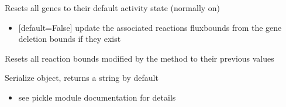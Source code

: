 \documentclass[letterpaper,10pt,english]{sphinxmanual}
\begin{document}
\begin{fulllineitems}
\begin{fulllineitems}
\end{fulllineitems}


\begin{fulllineitems}
\label{\detokenize{modules_doc:cbmpy.CBModel.Model.resetAllGenes}}
\pysigstartsignatures
{}
\pysigstopsignatures
\sphinxAtStartPar
Resets all genes to their default activity state (normally on)
\begin{itemize}
\item {} 
\sphinxAtStartPar
{} {[}default=False{]} update the associated reactions fluxbounds from the gene deletion bounds if they exist

\end{itemize}

\end{fulllineitems}


\begin{fulllineitems}
\label{\detokenize{modules_doc:cbmpy.CBModel.Model.resetAllInactiveGPRBounds}}
\pysigstartsignatures
{}
\pysigstopsignatures
\sphinxAtStartPar
Resets all reaction bounds modified by the  method to their previous values

\end{fulllineitems}


\begin{fulllineitems}
\label{\detokenize{modules_doc:cbmpy.CBModel.Model.serialize}}
\pysigstartsignatures
{}
\pysigstopsignatures
\sphinxAtStartPar
Serialize object, returns a string by default
\begin{itemize}
\item {} \begin{description}
\sphinxAtStartPar
see pickle module documentation for details


\end{description}
\end{itemize}
\end{fulllineitems}
\end{fulllineitems}
\end{document}
